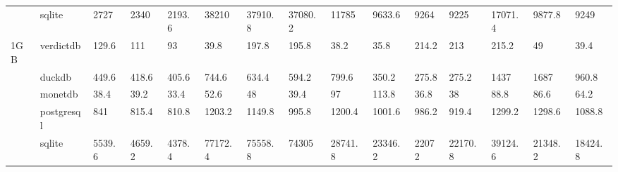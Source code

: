 \begin{table}[]
\begin{tabular}{ll|lllllllllllll}
                      & sqlite     & 2727                        & 2340                        & 2193.6                      & 38210                       & 37910.8                     & 37080.2                     & 11785                       & 9633.6                       & 9264                        & 9225                        & 17071.4                     & 9877.8                                              & 9249                                                \\
\multirow{-5}{*}{1GB} & verdictdb  & 129.6                       & 111                         & {\color[HTML]{009901} 93}   & {\color[HTML]{009901} 39.8} & 197.8                       & 195.8                       & {\color[HTML]{009901} 38.2} & {\color[HTML]{009901} 35.8}  & 214.2                       & 213                         & 215.2                       & {\color[HTML]{009901} 49}                           & {\color[HTML]{009901} 39.4}                         \\ \hline
                      & duckdb     & 449.6                       & 418.6                       & 405.6                       & 744.6                       & 634.4                       & 594.2                       & 799.6                       & 350.2                        & 275.8                       & 275.2                       & 1437                        & 1687                                                & 960.8                                               \\
                      & monetdb    & {\color[HTML]{009901} 38.4} & {\color[HTML]{009901} 39.2} & {\color[HTML]{009901} 33.4} & {\color[HTML]{009901} 52.6} & {\color[HTML]{009901} 48}   & {\color[HTML]{009901} 39.4} & {\color[HTML]{009901} 97}   & {\color[HTML]{333333} 113.8} & {\color[HTML]{009901} 36.8} & {\color[HTML]{009901} 38}   & {\color[HTML]{009901} 88.8} & {\color[HTML]{009901} 86.6}                         & {\color[HTML]{009901} 64.2}                         \\
                      & postgresql & 841                         & 815.4                       & 810.8                       & 1203.2                      & 1149.8                      & 995.8                       & 1200.4                      & 1001.6                       & 986.2                       & 919.4                       & 1299.2                      & 1298.6                                              & 1088.8                                              \\
                      & sqlite     & 5539.6                      & 4659.2                      & 4378.4                      & 77172.4                     & 75558.8                     & 74305                       & 28741.8                     & 23346.2                      & 22072                       & 22170.8                     & 39124.6                     & 21348.2                                             & 18424.8                                             \\

\end{tabular}
\end{table}
